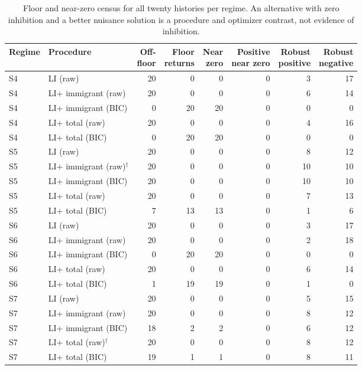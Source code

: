 \begin{table}[htbp]
\centering\small
\setlength{\tabcolsep}{2.5pt}
\caption{Floor and near-zero census for all twenty histories per regime. An alternative with zero inhibition and a better nuisance solution is a procedure and optimizer contrast, not evidence of inhibition.}
\label{tab:s04b-joint-disposition-floor-census}
\begin{tabular}{@{}llrrrrrr@{}}
\toprule
Regime & Procedure & \shortstack{Off-\\floor} & \shortstack{Floor\\returns} & \shortstack{Near\\zero} & \shortstack{Positive\\near zero} & \shortstack{Robust\\positive} & \shortstack{Robust\\negative} \\
\midrule
S4 & LI (raw) & 20 & 0 & 0 & 0 & 3 & 17 \\
S4 & LI+ immigrant (raw) & 20 & 0 & 0 & 0 & 6 & 14 \\
S4 & LI+ immigrant (BIC) & 0 & 20 & 20 & 0 & 0 & 0 \\
S4 & LI+ total (raw) & 20 & 0 & 0 & 0 & 4 & 16 \\
S4 & LI+ total (BIC) & 0 & 20 & 20 & 0 & 0 & 0 \\
S5 & LI (raw) & 20 & 0 & 0 & 0 & 8 & 12 \\
S5 & LI+ immigrant (raw)$^{\dagger}$ & 20 & 0 & 0 & 0 & 10 & 10 \\
S5 & LI+ immigrant (BIC) & 20 & 0 & 0 & 0 & 10 & 10 \\
S5 & LI+ total (raw) & 20 & 0 & 0 & 0 & 7 & 13 \\
S5 & LI+ total (BIC) & 7 & 13 & 13 & 0 & 1 & 6 \\
S6 & LI (raw) & 20 & 0 & 0 & 0 & 3 & 17 \\
S6 & LI+ immigrant (raw) & 20 & 0 & 0 & 0 & 2 & 18 \\
S6 & LI+ immigrant (BIC) & 0 & 20 & 20 & 0 & 0 & 0 \\
S6 & LI+ total (raw) & 20 & 0 & 0 & 0 & 6 & 14 \\
S6 & LI+ total (BIC) & 1 & 19 & 19 & 0 & 1 & 0 \\
S7 & LI (raw) & 20 & 0 & 0 & 0 & 5 & 15 \\
S7 & LI+ immigrant (raw) & 20 & 0 & 0 & 0 & 8 & 12 \\
S7 & LI+ immigrant (BIC) & 18 & 2 & 2 & 0 & 6 & 12 \\
S7 & LI+ total (raw)$^{\dagger}$ & 20 & 0 & 0 & 0 & 8 & 12 \\
S7 & LI+ total (BIC) & 19 & 1 & 1 & 0 & 8 & 11 \\
\bottomrule
\end{tabular}
\end{table}

